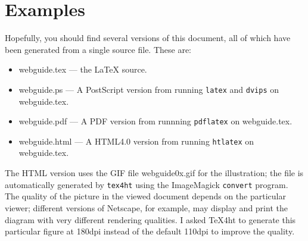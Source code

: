 \documentclass[11pt]{article}
\newcommand{\file}[1]{\textsf{#1}}
\newcommand{\program}[1]{\texttt{#1}}
\newcommand{\latex}{LaTeX}
\begin{document}
\section{Examples}

    Hopefully, you should find several versions of this document, all of
which have been generated from a single source file. These are:
\begin{itemize}
\item \file{webguide.tex} --- the \latex{} source.
\item \file{webguide.ps} --- A PostScript version from running
  \program{latex} and \program{dvips} on \file{webguide.tex}.
\item \file{webguide.pdf} --- A PDF version from runnning
   \program{pdflatex} on \file{webguide.tex}.
\item \file{webguide.html} --- A HTML4.0 version from running
   \program{htlatex} on \file{webguide.tex}. 
\end{itemize}
    The HTML version uses the GIF file 
\file{webguide0x.gif} for the illustration; the file is automatically 
generated by \program{tex4ht} using the ImageMagick \program{convert}
program. The quality of the picture in the viewed document depends on
the particular viewer; different versions of Netscape, for example, 
may display and print the diagram with very different rendering qualities.
I asked TeX4ht to generate this particular figure at 180dpi instead of
the default 110dpi to improve the quality.



\end{document}
